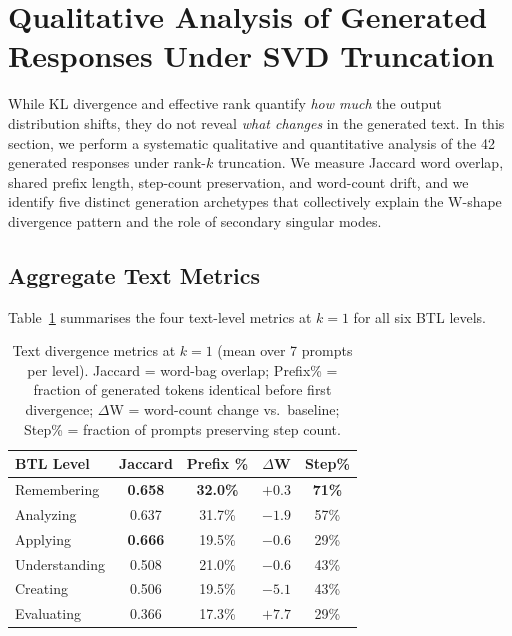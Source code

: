 
\section{Qualitative Analysis of Generated Responses Under SVD Truncation}

While KL divergence and effective rank quantify \textit{how much} the output distribution shifts,
they do not reveal \textit{what changes} in the generated text.
In this section, we perform a systematic qualitative and quantitative analysis of the 42 generated
responses under rank-$k$ truncation. We measure Jaccard word overlap, shared prefix length, step-count
preservation, and word-count drift, and we identify five distinct generation archetypes that collectively
explain the W-shape divergence pattern and the role of secondary singular modes.

\subsection{Aggregate Text Metrics}

Table~\ref{tab:text_metrics} summarises the four text-level metrics at $k=1$ for all six BTL levels.

\begin{table}[h]
\centering
\caption{Text divergence metrics at $k=1$ (mean over 7 prompts per level). Jaccard = word-bag overlap;
Prefix\% = fraction of generated tokens identical before first divergence;
$\Delta$W = word-count change vs.\ baseline; Step\% = fraction of prompts preserving step count.}
\label{tab:text_metrics}
\begin{tabular}{lcccc}
\toprule
\textbf{BTL Level} & \textbf{Jaccard} & \textbf{Prefix \%} & \textbf{$\Delta$W} & \textbf{Step\%} \\
\midrule
Remembering   & \textbf{0.658} & \textbf{32.0\%} &  $+0.3$ & \textbf{71\%} \\
Analyzing     & 0.637          & 31.7\%          &  $-1.9$ & 57\%          \\
Applying      & \textbf{0.666} & 19.5\%          &  $-0.6$ & 29\%          \\
Understanding & 0.508          & 21.0\%          &  $-0.6$ & 43\%          \\
Creating      & 0.506          & 19.5\%          &  $-5.1$ & 43\%          \\
Evaluating    & 0.366          & 17.3\%          & $+7.7$  & 29\%          \\
\bottomrule
\end{tabular}
\end{table}

